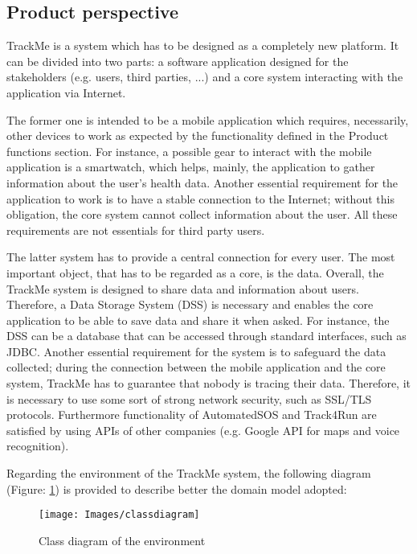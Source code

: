 \subsection{Product perspective}
TrackMe is a system which has to be designed as a completely new platform. It can be divided into 
two parts: a software application designed for the stakeholders (e.g. users, third parties, ...) and a 
core system interacting with the application via Internet. 
\par
The former one is intended to be a mobile application which requires, necessarily, other devices to work 
as expected by the functionality defined in the Product functions section. For instance, a possible gear 
to interact with the mobile application is a smartwatch, which helps, mainly, the application to 
gather information about the user's health data. Another essential requirement for the application to 
work is to have a stable connection to the Internet; without this obligation, the core system cannot 
collect information about the user. All these requirements are not essentials for third party users.
\par
The latter system has to provide a central connection for every user. The most important object, that has 
to be regarded as a core, is the data. Overall, the TrackMe system is designed to share data and 
information about users. Therefore, a Data Storage System (DSS) is necessary and enables the 
core application to be able to save data and share it when asked. For instance, the DSS can be a 
database that can be accessed through standard interfaces, such as JDBC. Another essential 
requirement for the system is to safeguard the data collected; during the connection between the 
mobile application and the core system, TrackMe has to guarantee that nobody is tracing their data. 
Therefore, it is necessary to use some sort of strong network security, such as SSL/TLS protocols. 
Furthermore functionality of AutomatedSOS and Track4Run are satisfied by using APIs of other companies 
(e.g. Google API for maps and voice recognition).
\\\par
Regarding the environment of the TrackMe system, the following diagram (Figure: \ref{fig:classdiagram}) 
is provided to describe better the domain model adopted:\\

\begin{figure}[H]
\texttt{[image: Images/classdiagram]}
\caption{Class diagram of the environment}
\label{fig:classdiagram}
\end{figure}

